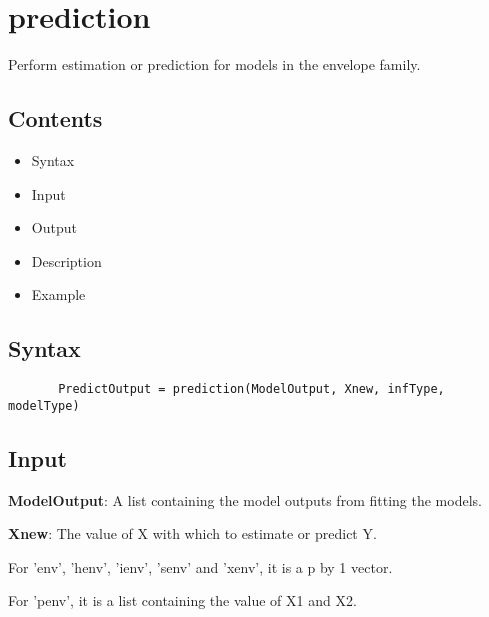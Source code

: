 \documentclass[a4paper,11pt,openany]{memoir}
\begin{document}
\newpage

\rmfamily
\color{black}\section{prediction}

\begin{par}
Perform estimation or prediction for models in the envelope family.
\end{par} \vspace{1em}

\subsection*{Contents}

\begin{itemize}
\setlength{\itemsep}{-1ex}
   \item Syntax
   \item Input
   \item Output
   \item Description
   \item Example
\end{itemize}


\subsection*{Syntax}


\begin{verbatim}       PredictOutput = prediction(ModelOutput, Xnew, infType, modelType)\end{verbatim}
    

\subsection*{Input}

\begin{par}
\textbf{ModelOutput}: A list containing the model outputs from fitting the models.
\end{par} \vspace{1em}
\begin{par}
\textbf{Xnew}: The value of X with which to estimate or predict Y.
\end{par} \vspace{1em}
\begin{par}
For 'env', 'henv', 'ienv', 'senv' and 'xenv', it is a p by 1 vector.
\end{par} \vspace{1em}
\begin{par}
For 'penv', it is a list containing the value of X1 and X2.
\end{par} \vspace{1em}
\end{document}
